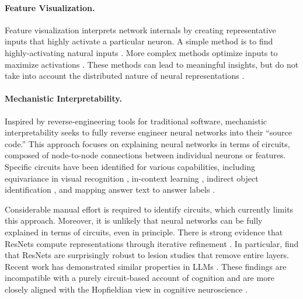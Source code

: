 \paragraph{Feature Visualization.} Feature visualization interprets network internals by creating representative inputs that highly activate a particular neuron. A simple method is to find highly-activating natural inputs \citep{szegedy2013intriguing, zeiler2014visualizing}. More complex methods optimize inputs to maximize activations \citep{erhan2009visualizing, mordvintsev2015inceptionism, yosinski2015understanding, nguyen2016synthesizing, nguyen2019understanding}. These methods can lead to meaningful insights, but do not take into account the distributed nature of neural representations \citep{hinton1984distributed, szegedy2013intriguing, fong2018net2vec, elhage2022superposition}.





\paragraph{Mechanistic Interpretability.}




Inspired by reverse-engineering tools for traditional software, mechanistic interpretability seeks to fully reverse engineer neural networks into their ``source code.'' This approach focuses on explaining neural networks in terms of circuits, composed of node-to-node connections between individual neurons or features. Specific circuits have been identified for various capabilities, including equivariance in visual recognition \citep{olah2020zoom}, in-context learning \citep{olsson2022context}, indirect object identification \citep{wang2023interpretability}, and mapping answer text to answer labels \citep{lieberum2023does}.

Considerable manual effort is required to identify circuits, which currently limits this approach. Moreover, it is unlikely that neural networks can be fully explained in terms of circuits, even in principle. There is strong evidence that ResNets compute representations through iterative refinement \citep{liao2016bridging, greff2016highway, jastrzebski2018residual}. In particular, \citet{veit2016residual} find that ResNets are surprisingly robust to lesion studies that remove entire layers. Recent work has demonstrated similar properties in LLMs \citep{mcgrath2023hydra, belrose2023eliciting}. These findings are incompatible with a purely circuit-based account of cognition and are more closely aligned with the Hopfieldian view in cognitive neuroscience \citep{barack2021two}.
















